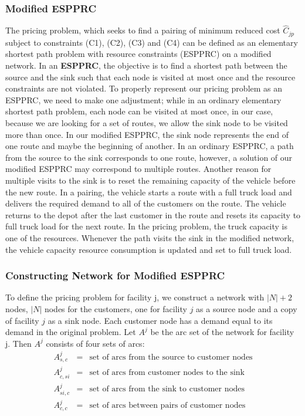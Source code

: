 \subsubsection{Modified ESPPRC}
The pricing problem, which seeks to find a pairing of minimum reduced cost $\hat{C}_{jp}$ 
subject to constraints (C1), (C2), (C3) and (C4) can be defined as an elementary shortest 
path problem with resource constraints (ESPPRC) on a modified network. In an {\bf ESPPRC}, 
the objective is to find a shortest path between the source and the sink such that each node 
is visited at most once and the resource constraints are not violated. To properly represent
our pricing problem as an ESPPRC, we need to make one adjustment; while in an ordinary 
elementary shortest path problem, each node can be visited at most once, in our case, 
because we are looking for a set of routes, we allow the sink node to be visited more than 
once. In our modified ESPPRC, the sink node represents the end of one route and maybe the 
beginning of another. In an ordinary ESPPRC, a path from the source to the sink corresponds 
to one route, however, a solution of our modified ESPPRC may correspond to multiple routes. 
Another reason for multiple visits to the sink is to reset the remaining capacity of the vehicle 
before the new route. In a pairing, the vehicle starts a route with a full truck 
load and delivers the required demand to all of the customers on the route. The vehicle returns 
to the depot after the last customer in the route and resets its capacity to full truck load for 
the next route. In the pricing problem, the truck capacity is one of the resources. Whenever the 
path visits the sink in the modified network, the vehicle capacity resource consumption is updated and 
set to full truck load. 

\subsubsection{Constructing Network for Modified ESPPRC}
To define the pricing problem for facility j, we construct a network with $|N|+2$ nodes, 
$|N|$ nodes for the customers, one for facility $j$ as a source node and a copy of facility 
$j$ as a sink node. Each customer node has a demand equal to its demand in the original problem. 
Let $A^j$ be the arc set of the network for facility j. Then $A^j$ consists of four sets of arcs: 
\begin{eqnarray*}
A^{j}_{s,c} & = &\mbox{set of arcs from the source to customer nodes} \\ 
A^{j}_{c,si} & = &\mbox{set of arcs from customer nodes to the sink} \\
A^{j}_{si,c} & = &\mbox{set of arcs from the sink to customer nodes} \\
A^{j}_{c,c}  & = &\mbox{set of arcs between pairs of customer nodes}
\end{eqnarray*}

